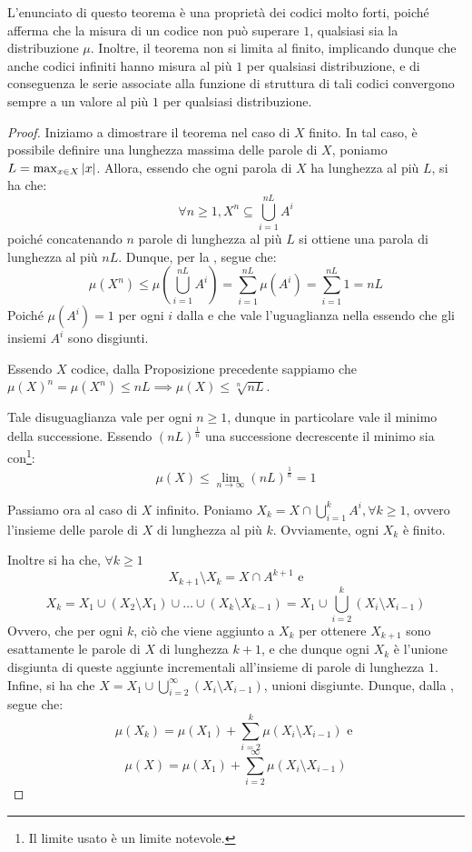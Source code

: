 L'enunciato di questo teorema è una proprietà dei codici molto forti, poiché afferma che la misura di un codice non può superare \(1\), qualsiasi sia la distribuzione \(\mu\).
Inoltre, il teorema non si limita al finito, implicando dunque che anche codici infiniti hanno misura al più \(1\) per qualsiasi distribuzione, e di conseguenza le serie associate alla funzione di struttura di tali codici convergono sempre a un valore al più \(1\) per qualsiasi distribuzione.
\begin{proof}
  Iniziamo a dimostrare il teorema nel caso di \(X\) finito.
  In tal caso, è possibile definire una lunghezza massima delle parole di \(X\), poniamo \(L = \max_{x \in X} \left|x\right|\).
  Allora, essendo che ogni parola di \(X\) ha lunghezza al più \(L\), si ha che:
  \[\forall n \geq 1, X^n \subseteq \bigcup_{i=1}^{nL} A^i\]
  poiché concatenando \(n\) parole di lunghezza al più \(L\) si ottiene una parola di lunghezza al più \(nL\).
  Dunque, per la , segue che:
  \[\mu(X^n) \leq \mu(\bigcup_{i=1}^{nL} A^i) = \sum_{i=1}^{nL} \mu(A^i) = \sum_{i=1}^{nL} 1 = nL\]
  Poiché \(\mu(A^i) = 1\) per ogni \(i\) dalla  e che vale l'uguaglianza nella  essendo che gli insiemi \(A^i\) sono disgiunti.

  Essendo \(X\) codice, dalla Proposizione precedente sappiamo che \({\mu(X)}^n = \mu(X^n) \leq nL \implies \mu(X) \leq \sqrt[n]{nL}\).

  Tale disuguaglianza vale per ogni \(n \geq 1\), dunque in particolare vale il minimo della successione.
  Essendo \({(nL)}^{\frac{1}{n}}\) una successione decrescente il minimo sia con\footnote{Il limite usato è un limite notevole.}:
  \[\mu(X) \leq \lim_{n \to \infty} {(nL)}^{\frac{1}{n}} = 1\]

  Passiamo ora al caso di \(X\) infinito.
  Poniamo \(X_k = X \cap \bigcup_{i=1}^{k} A^i, \forall k \geq 1\), ovvero l'insieme delle parole di \(X\) di lunghezza al più \(k\).
  Ovviamente, ogni \(X_k\) è finito.

  Inoltre si ha che, \(\forall k \geq 1\)
  \[X_{k+1}\setminus X_k = X \cap A^{k+1} \text{ e}\]
  \[X_k = X_1 \cup (X_2 \setminus X_1) \cup \ldots \cup (X_k \setminus X_{k-1}) = X_1 \cup \bigcup_{i=2}^{k} (X_i \setminus X_{i-1})\]
  Ovvero, che per ogni \(k\), ciò che viene aggiunto a \(X_k\) per ottenere \(X_{k+1}\) sono esattamente le parole di \(X\) di lunghezza \(k+1\), e che dunque ogni \(X_k\) è l'unione disgiunta di queste aggiunte incrementali all'insieme di parole di lunghezza \(1\).
  Infine, si ha che \(X = X_1 \cup \bigcup_{i=2}^{\infty} (X_i \setminus X_{i-1})\), unioni disgiunte.
  Dunque, dalla , segue che:
  \[\mu(X_k) = \mu(X_1) + \sum_{i=2}^{k} \mu(X_i \setminus X_{i-1}) \text{ e }\]
  \[\mu(X) = \mu(X_1) + \sum_{i=2}^{\infty} \mu(X_i \setminus X_{i-1})\]


\end{proof}
